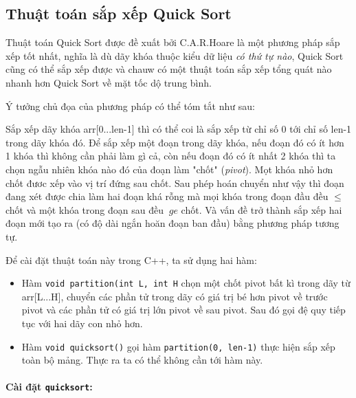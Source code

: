 \documentclass[8pt, a4paper]{article}
\newcommand{\mnt}[1]{\inputminted[frame=single, linenos=true, tabsize=4]{c++}{#1}}
\begin{document}
\subsection{Thuật toán sắp xếp Quick Sort}

Thuật toán Quick Sort được đề xuất bởi C.A.R.Hoare là một phương pháp sắp xếp tốt nhất, nghĩa là dù dãy khóa thuộc kiểu dữ liệu \emph{có thứ tự nào}, Quick Sort cũng có thể sắp xếp được và chauw có một thuật toán sắp xếp tổng quát nào nhanh hơn Quick Sort về mặt tốc dộ trung bình. 

Ý tưởng chủ đọa của phương pháp có thể tóm tắt như sau:

Sắp xếp dãy khóa arr[0...len-1] thì có thể coi là sắp xếp từ chỉ số 0 tới chỉ số len-1 trong dãy khóa đó. Để sắp xếp một đoạn trong dãy khóa, nếu đoạn đó có ít hơn 1 khóa thì không cần phải làm gì cả, còn nếu đoạn đó có ít nhất 2 khóa thì ta chọn ngẫu nhiên khóa nào đó của đoạn làm "chốt" (\emph{pivot}). Mọt khóa nhỏ hơn chốt đươc xếp vào vị trí đứng sau chốt. Sau phép hoán chuyển như vậy thì đoạn đang xét được chia làm hai đoạn khá rỗng mà mọi khóa trong đoạn đầu đều $ \le $ chốt và một khóa trong đoạn sau đều $\ ge $ chốt. Và vấn đề trở thành sắp xếp hai đoạn mới tạo ra (có độ dài ngắn hoăn đoạn ban đầu) bằng phương pháp tương tự.

Để cài đặt thuật toán này trong C++, ta sử dụng hai hàm:

\begin{itemize} 
\item Hàm \texttt{void partition(int L, int H} chọn một chốt pivot bất kì trong dãy từ arr[L...H], chuyển các phần tử trong dãy có giá trị bé hơn pivot về trước pivot và các phần tử có giá trị lớn pivot về sau pivot. Sau đó gọi đệ quy tiếp tục với hai dãy con nhỏ hơn.
\item Hàm \texttt{void quicksort()} gọi hàm \texttt{partition(0, len-1)} thực hiện sắp xếp toàn bộ mảng. Thực ra ta có thể không cần tới hàm này.
\end{itemize}

\paragraph{Cài đặt \texttt{quicksort}: }
\mnt{src/quicksort.cpp}
\end{document}
